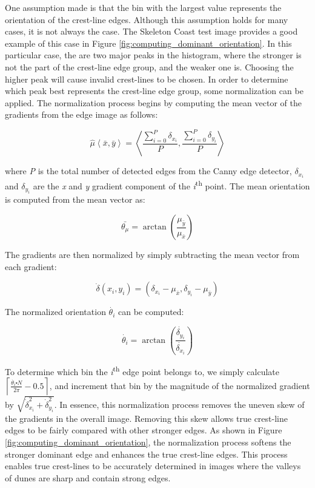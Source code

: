\documentclass[review]{elsarticle}
\begin{document}
One assumption made is that the bin with the largest value represents the orientation of the crest-line edges. Although this assumption holds for many cases, it is not always the case. The Skeleton Coast test image provides a good example of this case in Figure \ref{fig:computing_dominant_orientation}. In this particular case, the are two major peaks in the histogram, where the stronger is not the part of the crest-line edge group, and the weaker one is. Choosing the higher peak will cause invalid crest-lines to be chosen. In order to determine which peak best represents the crest-line edge group, some normalization can be applied. The normalization process begins by computing the mean vector of the gradients from the edge image as follows:

\[
\hat{\mu}\left\langle \bar{x},\bar{y}\right\rangle =\left\langle \frac{\sum_{i=0}^{P}\delta_{x_{i}}}{P},\frac{\sum_{i=0}^{P}\delta_{y_{i}}}{P}\right\rangle 
\]

where \emph{P} is the total number of detected edges from the Canny edge detector, $\delta_{x_{i}}$ and $\delta_{y_{i}}$ are the \emph{x} and \emph{y} gradient component of the \emph{i}\textsuperscript{th} point. The
mean orientation is computed from the mean vector as:

\[
\bar{\theta_{\mu}}=\arctan\left(\frac{\mu_{\bar{y}}}{\mu_{\bar{x}}}\right)
\]

The gradients are then normalized by simply subtracting the mean vector from each gradient:

\[
\dot{\delta}\left(x_{i},y_{i}\right)=\left(\delta_{x_{i}}-\mu_{\bar{x}},\delta_{y_{i}}-\mu_{\bar{y}}\right)
\]

The normalized orientation $\dot{\theta_{i}}$ can be computed:

\[
\dot{\theta_{i}}=\arctan\left(\frac{\dot{\delta_{y_{i}}}}{\dot{\delta_{x_{i}}}}\right)
\]

To determine which bin the \emph{i}\textsuperscript{th}	edge point belongs to, we simply calculate $\left\lceil \frac{\dot{\theta_{i}}\centerdot N}{2\pi}-0.5\right\rceil $,	and increment that bin by the magnitude of the normalized gradient	by $\sqrt{\dot{\delta}_{x_{i}}^{2}+\dot{\delta}_{y_{i}}^{2}}$. In essence, this normalization process removes the uneven skew of the gradients in the overall image. Removing this skew allows true crest-line edges to be fairly compared with other stronger edges. As shown in Figure \ref{fig:computing_dominant_orientation}, the normalization process softens the stronger dominant edge and enhances the true crest-line edges. This process enables true crest-lines to be accurately determined in images where the valleys of dunes are sharp and contain strong edges.
\end{document}
